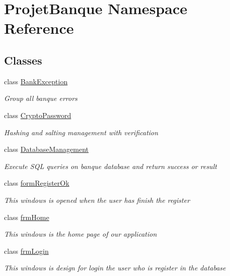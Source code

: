 \hypertarget{namespace_projet_banque}{}\section{Projet\+Banque Namespace Reference}
\label{namespace_projet_banque}
\subsection*{Classes}
\begin{DoxyCompactItemize}
\item 
class \mbox{\hyperlink{class_projet_banque_1_1_bank_exception}{Bank\+Exception}}
\begin{DoxyCompactList}\small\item\em Group all banque errors \end{DoxyCompactList}\item 
class \mbox{\hyperlink{class_projet_banque_1_1_crypto_password}{Crypto\+Password}}
\begin{DoxyCompactList}\small\item\em Hashing and salting management with verification \end{DoxyCompactList}\item 
class \mbox{\hyperlink{class_projet_banque_1_1_database_management}{Database\+Management}}
\begin{DoxyCompactList}\small\item\em Execute S\+QL queries on banque database and return success or result \end{DoxyCompactList}\item 
class \mbox{\hyperlink{class_projet_banque_1_1form_register_ok}{form\+Register\+Ok}}
\begin{DoxyCompactList}\small\item\em This windows is opened when the user has finish the register \end{DoxyCompactList}\item 
class \mbox{\hyperlink{class_projet_banque_1_1frm_home}{frm\+Home}}
\begin{DoxyCompactList}\small\item\em This windows is the home page of our application \end{DoxyCompactList}\item 
class \mbox{\hyperlink{class_projet_banque_1_1frm_login}{frm\+Login}}
\begin{DoxyCompactList}\small\item\em This windows is design for login the user who is register in the database \end{DoxyCompactList}\item 

\end{DoxyCompactItemize}
